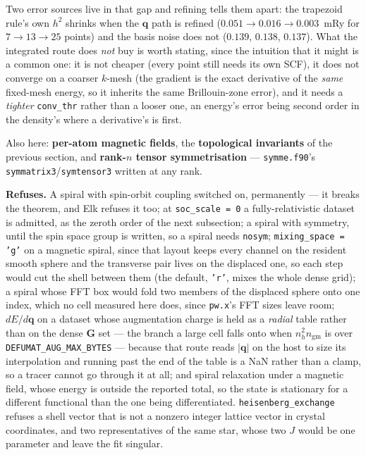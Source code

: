 \documentclass[11pt,a4paper]{article}
\newcommand{\code}[1]{\texttt{\small #1}}
\begin{document}
Two error sources live in that gap and refining tells them apart: the trapezoid
rule's own $h^2$ shrinks when the $\mathbf q$ path is refined ($0.051 \to 0.016
\to 0.003$~mRy for $7 \to 13 \to 25$ points) and the basis noise does not
($0.139$, $0.138$, $0.137$). What the integrated route does \emph{not} buy is
worth stating, since the intuition that it might is a common one: it is not
cheaper (every point still needs its own SCF), it does not converge on a coarser
$k$-mesh (the gradient is the exact derivative of the \emph{same} fixed-mesh
energy, so it inherits the same Brillouin-zone error), and it needs a
\emph{tighter} \code{conv\_thr} rather than a looser one, an energy's error
being second order in the density's where a derivative's is first.

Also here: \textbf{per-atom magnetic fields}, the \textbf{topological
invariants} of the previous section, and \textbf{rank-$n$ tensor
symmetrisation} --- \code{symme.f90}'s \code{symmatrix3}/\code{symtensor3}
written at any rank.

\begin{refuses}
\textbf{Refuses.} A spiral with spin-orbit coupling switched on, permanently
--- it breaks the theorem, and Elk refuses it too; at \code{soc\_scale = 0} a
fully-relativistic dataset is admitted, as the zeroth order of the next
subsection; a spiral with symmetry, until the spin
space group is written, so a spiral needs \code{nosym};
\code{mixing\_space = 'g'} on a magnetic spiral, since that layout keeps every
channel on the resident smooth sphere and the transverse pair lives on the
displaced one, so each step would cut the shell between them (the default,
\code{'r'}, mixes the whole dense grid); a spiral whose FFT box would fold two
members of the displaced sphere onto one index, which no cell measured here
does, since \code{pw.x}'s FFT sizes leave room; $dE/d\mathbf q$ on a
dataset whose augmentation charge is held as a \emph{radial} table rather than
on the dense $\mathbf G$ set --- the branch a large cell falls onto when
$n_h^2 n_{\mathrm{gm}}$ is over \code{DEFUMAT\_AUG\_MAX\_BYTES} --- because that
route reads $|\mathbf q|$ on the host to size its interpolation and running past
the end of the table is a NaN rather than a clamp, so a tracer cannot go through
it at all; and spiral relaxation under a magnetic field, whose energy is outside
the reported total, so the state is stationary for a different functional than
the one being differentiated. \code{heisenberg\_exchange} refuses a shell
vector that is not a nonzero integer lattice vector in crystal coordinates, and
two representatives of the same star, whose two $J$ would be one parameter and
leave the fit singular.
\end{refuses}
\end{document}

